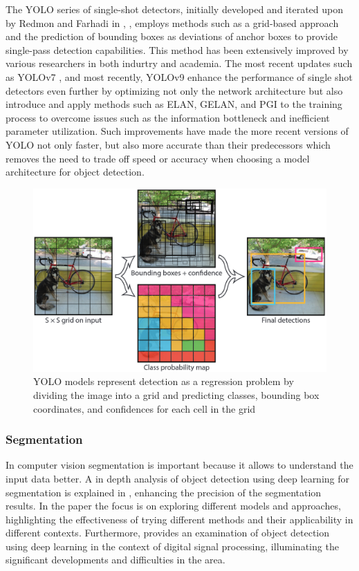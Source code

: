 \documentclass{IEEEtran}
\begin{document}
	The YOLO series of single-shot detectors, initially developed and iterated upon by Redmon and Farhadi in \cite{yolov1}, \cite{yolov2}, \cite{yolov3} employs methods such as a grid-based approach and the prediction of bounding boxes as deviations of anchor boxes to provide single-pass detection capabilities. This method has been extensively improved by various researchers in both indurtry and academia. The most recent updates such as YOLOv7 \cite{yolov7}, and most recently, YOLOv9 \cite{yolov9} enhance the performance of single shot detectors even further by optimizing not only the network architecture but also introduce and apply methods such as ELAN, GELAN, and PGI to the training process to overcome issues such as the information bottleneck and inefficient parameter utilization\cite{yolov7}\cite{yolov9}. Such improvements have made the more recent versions of YOLO not only faster, but also more accurate than their predecessors which removes the need to trade off speed or accuracy when choosing a model architecture for object detection. 
	
	\begin{figure}
		\centering
		\includegraphics[width=0.8\linewidth]{images/yolo_detect_viz.png}
		\caption{YOLO models represent detection as a regression problem by dividing the image into a grid and predicting classes, bounding box coordinates, and confidences for each cell in the grid \cite{yolov1}}
		\label{fig:yolo_viz}
	\end{figure}
	
	\subsubsection{Segmentation}
	In computer vision segmentation is important because it allows to understand the input data better. A in depth analysis of object detection using deep learning for segmentation is explained in \cite{segm1}, enhancing the precision of the segmentation results. In the paper \cite{segm2} the focus is on exploring different models and approaches, highlighting the effectiveness of trying different methods and their applicability in different contexts. Furthermore, \cite{segm3} provides an examination of object detection using deep learning in the context of digital signal processing, illuminating the significant developments and difficulties in the area.
	
\end{document}
